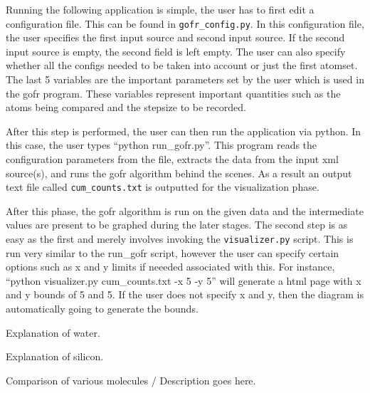 Running the following application is simple, the user has to first edit a configuration file. This can be found in \verb|gofr_config.py|. In this configuration file, the user specifies the first input source and second input source. If the second input source is empty, the second field is left empty. The user can also specify whether all the configs needed to be taken into account or just the first atomset. The last 5 variables are the important parameters set by the user which is used in the gofr program. These variables represent important quantities such as the atoms being compared and the stepsize to be recorded.




After this step is performed, the user can then run the application via python. In this case, the user types ``python run_gofr.py''. This program reads the configuration parameters from the file, extracts the data from the input xml source(s), and runs the gofr algorithm behind the scenes. As a result an output text file called \verb|cum_counts.txt| is outputted for the visualization phase.





After this phase, the gofr algorithm is run on the given data and the intermediate values are present to be graphed during the later stages. The second step is as easy as the first and merely involves invoking the \verb|visualizer.py| script. This is run very similar to the run_gofr script, however the user can specify certain options such as x and y limits if neeeded associated with this. For instance, ``python visualizer.py cum_counts.txt -x 5 -y 5'' will generate a html page with x and y bounds of 5 and 5. If the user does not specify x and y, then the diagram is automatically going to generate the bounds. 






Explanation of water.


Explanation of silicon.


Comparison of various molecules / Description goes here.


